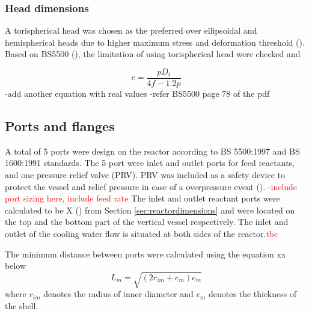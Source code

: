 \subsubsection{Head dimensions}
A torispherical head was chosen as the preferred over ellipsoidal and hemispherical heads due to higher maximum stress and deformation threshold (). 
Based on BS5500 (), the limitation of using torispherical head were checked and %

\begin{equation}
    e = \frac{pD_i}{4f-1.2p}
    \label{eqn:hemisphericalend}
\end{equation}
-add another equation with real values
-refer BS5500 page 78 of the pdf
\subsection{Ports and flanges}
A total of 5 ports were design on the reactor according to BS 5500:1997 and BS 1600:1991 standards. The 5 port were inlet and outlet ports for feed reactants, and one pressure relief valve (PRV). PRV was included as a safety device to protect the vessel and relief pressure in case of a overpressure event (). 
\textcolor{red}{-include port sizing here, include feed rate}
The inlet and outlet reactant ports were calculated to be X () from Section \ref{sec:reactordimensions} and were located on the top and the bottom part of the vertical vessel respectively. 
The inlet and outlet of the cooling water flow is situated at both sides of the reactor.\textcolor{red}{tbc}





The minimum distance between ports were calculated using the equation xx below
\begin{equation}
    L_m = \sqrt{(2r_{im}+e_{m})e_m}
\end{equation}
where $r_{im}$ denotes the radius of inner diameter and $e_m$ denotes the thickness of the shell. 


